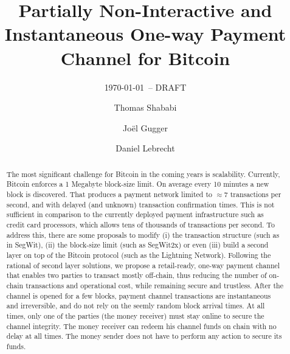 \documentclass{llncs}
\begin{document}
\title{Partially Non-Interactive and Instantaneous One-way Payment Channel for
Bitcoin}
\author{Thomas Shababi \and Jo\"el Gugger \and Daniel
Lebrecht}
\subtitle{{\normalsize\today{\small\ -- DRAFT}}}

\maketitle

\begin{abstract} The most significant challenge for Bitcoin in the coming years
  is scalability. Currently, Bitcoin enforces a 1 Megabyte block-size limit. On
  average every 10 minutes a new block is discovered. That produces a payment
  network limited to $\approx7$ transactions per second, and with delayed (and
  unknown) transaction confirmation times. This is not sufficient in comparison
  to the currently deployed payment infrastructure such as credit card
  processors, which allows tens of thousands of transactions per second. To
  address this, there are some proposals to modify (i) the transaction structure
  (such as in SegWit), (ii) the block-size limit (such as SegWit2x) or even
  (iii) build a second layer on top of the Bitcoin protocol (such as the
  Lightning Network). Following the rational of second layer solutions, we
  propose a retail-ready, one-way payment channel that enables two parties to
  transact mostly off-chain, thus reducing the number of on-chain transactions
  and operational cost, while remaining secure and trustless. After the channel
  is opened for a few blocks, payment channel transactions are instantaneous and
  irreversible, and do not rely on the seemly random block arrival times. At all
  times, only one of the parties (the money receiver) must stay online to secure
  the channel integrity. The money receiver can redeem his channel funds on
  chain with no delay at all times. The money sender does not have to perform
  any action to secure its funds. 
\end{abstract}
%
\end{document}
